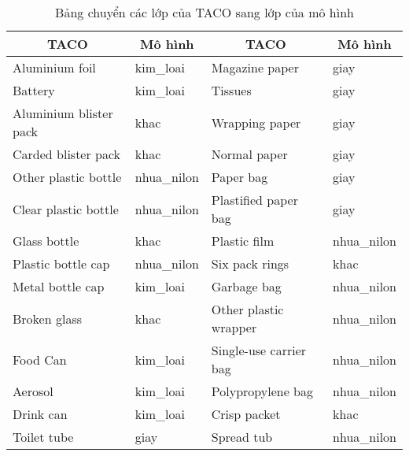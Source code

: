 \documentclass[../the.tex]{subfiles}
\begin{document}
\begin{table}[!ht]
	\centering
	\caption{Bảng chuyển các lớp của TACO sang lớp của mô hình}
	\begin{tabular}{|l|l|l|l|}
		\hline
		\multicolumn{1}{|c|}{\textbf{TACO}}
		                       & \multicolumn{1}{c|}{\textbf{Mô hình}}
		                       & \multicolumn{1}{c|}{\textbf{TACO}}
		                       & \multicolumn{1}{c|}{\textbf{Mô hình}}                                           \\
		\hline
		Aluminium foil         & kim\_loai                             & Magazine paper            & giay        \\ \hline
		Battery                & kim\_loai                             & Tissues                   & giay        \\ \hline
		Aluminium blister pack & khac                                  & Wrapping paper            & giay        \\ \hline
		Carded blister pack    & khac                                  & Normal paper              & giay        \\ \hline
		Other plastic bottle   & nhua\_nilon                           & Paper bag                 & giay        \\ \hline
		Clear plastic bottle   & nhua\_nilon                           & Plastified paper bag      & giay        \\ \hline
		Glass bottle           & khac                                  & Plastic film              & nhua\_nilon \\ \hline
		Plastic bottle cap     & nhua\_nilon                           & Six pack rings            & khac        \\ \hline
		Metal bottle cap       & kim\_loai                             & Garbage bag               & nhua\_nilon \\ \hline
		Broken glass           & khac                                  & Other plastic wrapper     & nhua\_nilon \\ \hline
		Food Can               & kim\_loai                             & Single-use carrier bag    & nhua\_nilon \\ \hline
		Aerosol                & kim\_loai                             & Polypropylene bag         & nhua\_nilon \\ \hline
		Drink can              & kim\_loai                             & Crisp packet              & khac        \\ \hline
		Toilet tube            & giay                                  & Spread tub                & nhua\_nilon \\ \hline

\end{tabular}
\end{table}
\end{document}
